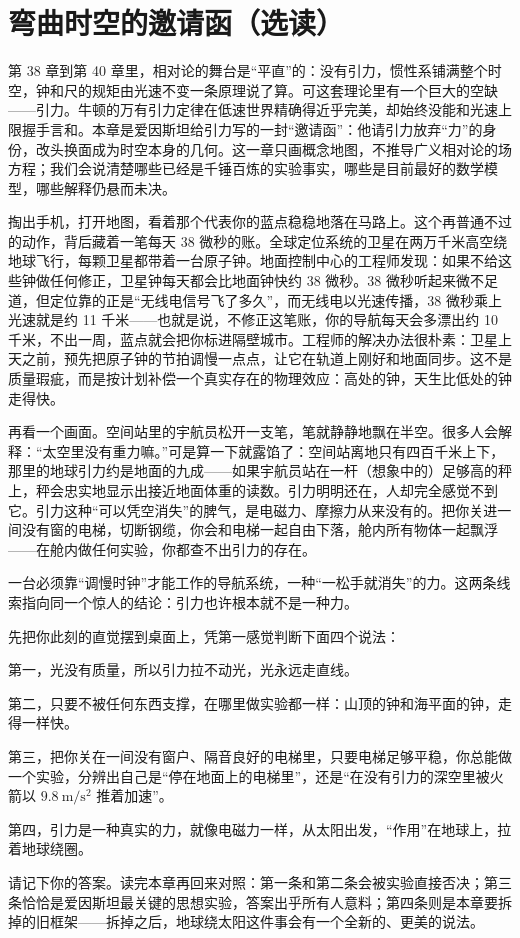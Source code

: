 \chapter{弯曲时空的邀请函（选读）}

第 38 章到第 40 章里，相对论的舞台是“平直”的：没有引力，惯性系铺满整个时空，钟和尺的规矩由光速不变一条原理说了算。可这套理论里有一个巨大的空缺——引力。牛顿的万有引力定律在低速世界精确得近乎完美，却始终没能和光速上限握手言和。本章是爱因斯坦给引力写的一封“邀请函”：他请引力放弃“力”的身份，改头换面成为时空本身的几何。这一章只画概念地图，不推导广义相对论的场方程；我们会说清楚哪些已经是千锤百炼的实验事实，哪些是目前最好的数学模型，哪些解释仍悬而未决。


\begin{mainline}
掏出手机，打开地图，看着那个代表你的蓝点稳稳地落在马路上。这个再普通不过的动作，背后藏着一笔每天 38 微秒的账。全球定位系统的卫星在两万千米高空绕地球飞行，每颗卫星都带着一台原子钟。地面控制中心的工程师发现：如果不给这些钟做任何修正，卫星钟每天都会比地面钟快约 38 微秒。38 微秒听起来微不足道，但定位靠的正是“无线电信号飞了多久”，而无线电以光速传播，38 微秒乘上光速就是约 11 千米——也就是说，不修正这笔账，你的导航每天会多漂出约 10 千米，不出一周，蓝点就会把你标进隔壁城市。工程师的解决办法很朴素：卫星上天之前，预先把原子钟的节拍调慢一点点，让它在轨道上刚好和地面同步。这不是质量瑕疵，而是按计划补偿一个真实存在的物理效应：高处的钟，天生比低处的钟走得快。

再看一个画面。空间站里的宇航员松开一支笔，笔就静静地飘在半空。很多人会解释：“太空里没有重力嘛。”可是算一下就露馅了：空间站离地只有四百千米上下，那里的地球引力约是地面的九成——如果宇航员站在一杆（想象中的）足够高的秤上，秤会忠实地显示出接近地面体重的读数。引力明明还在，人却完全感觉不到它。引力这种“可以凭空消失”的脾气，是电磁力、摩擦力从来没有的。把你关进一间没有窗的电梯，切断钢缆，你会和电梯一起自由下落，舱内所有物体一起飘浮——在舱内做任何实验，你都查不出引力的存在。

一台必须靠“调慢时钟”才能工作的导航系统，一种“一松手就消失”的力。这两条线索指向同一个惊人的结论：引力也许根本就不是一种力。
\end{mainline}


\begin{mainline}
先把你此刻的直觉摆到桌面上，凭第一感觉判断下面四个说法：

第一，光没有质量，所以引力拉不动光，光永远走直线。

第二，只要不被任何东西支撑，在哪里做实验都一样：山顶的钟和海平面的钟，走得一样快。

第三，把你关在一间没有窗户、隔音良好的电梯里，只要电梯足够平稳，你总能做一个实验，分辨出自己是“停在地面上的电梯里”，还是“在没有引力的深空里被火箭以 \(9.8\ \mathrm{m/s^{2}}\) 推着加速”。

第四，引力是一种真实的力，就像电磁力一样，从太阳出发，“作用”在地球上，拉着地球绕圈。

请记下你的答案。读完本章再回来对照：第一条和第二条会被实验直接否决；第三条恰恰是爱因斯坦最关键的思想实验，答案出乎所有人意料；第四条则是本章要拆掉的旧框架——拆掉之后，地球绕太阳这件事会有一个全新的、更美的说法。
\end{mainline}


